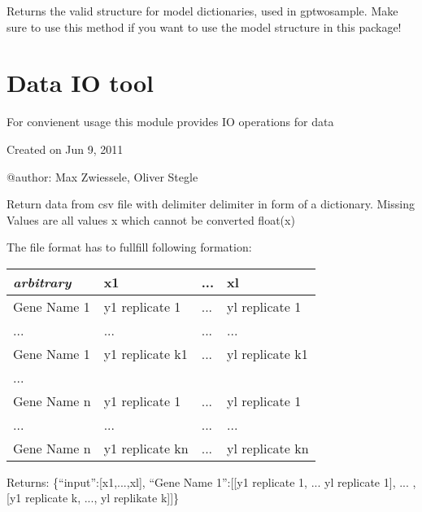 \documentclass[letterpaper,10pt]{sphinxmanual}
\begin{document}
\begin{fulllineitems}
\label{data:gptwosample.data.data_base.has_model_structure}
Returns the valid structure for model dictionaries, used in gptwosample.
Make sure to use this method if you want to use the model structure in this package!

\end{fulllineitems}

\label{data:module-gptwosample.data.dataIO}

\section{Data IO tool}
\label{data:data-io-tool}
For convienent usage this module provides IO operations for data

Created on Jun 9, 2011

@author: Max Zwiessele, Oliver Stegle

\begin{fulllineitems}
\label{data:gptwosample.data.dataIO.get_data_from_csv}
Return data from csv file with delimiter delimiter in form of a dictionary.
Missing Values are all values x which cannot be converted float(x)

The file format has to fullfill following formation:

\begin{tabulary}{\linewidth}{|L|L|L|L|}
\hline
\textbf{
\emph{arbitrary}
} & \textbf{
x1
} & \textbf{
...
} & \textbf{
xl
}\\\hline

Gene Name 1
 & 
y1 replicate 1
 & 
...
 & 
yl replicate 1
\\\hline

...
 & 
...
 & 
...
 & 
...
\\\hline

Gene Name 1
 & 
y1 replicate k1
 & 
...
 & 
yl replicate k1
\\\hline

...
 &  &  & \\\hline

Gene Name n
 & 
y1 replicate 1
 & 
...
 & 
yl replicate 1
\\\hline

...
 & 
...
 & 
...
 & 
...
\\\hline

Gene Name n
 & 
y1 replicate kn
 & 
...
 & 
yl replicate kn
\\\hline
\end{tabulary}


Returns: \{``input'':{[}x1,...,xl{]}, ``Gene Name 1'':{[}{[}y1 replicate 1, ... yl replicate 1{]}, ... ,{[}y1 replicate k, ..., yl replikate k{]}{]}\}

\end{fulllineitems}
\end{document}
